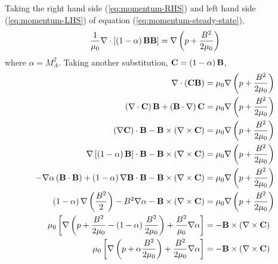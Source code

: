 Taking the right hand side (\ref{eq:momentum-RHS}) and left hand side (\ref{eq:momentum-LHS}) of equation (\ref{eq:momentum-steady-state}),
\begin{equation}
    \frac{1}{\mu_0}\nabla \cdot\left[ \left( 1-\alpha \right)\mathbf{B}\mathbf{B} \right] = \nabla\left( p + \frac{B^2}{2\mu_0} \right)
\end{equation}
where $\alpha=M_A^2$. Taking another substitution, $\mathbf{C} = \left( 1-\alpha \right)\mathbf{B}$,
\begin{equation}
    \label{eq:deldotCB}
    \begin{split}
        \nabla \cdot\left( \mathbf{C}\mathbf{B} \right) &= \mu_0\nabla\left( p + \frac{B^2}{2\mu_0} \right) \\
        \left( \nabla \cdot\mathbf{C} \right)\mathbf{B} + \left( \mathbf{B}\cdot\nabla \right)\mathbf{C} &= \mu_0\nabla\left( p + \frac{B^2}{2\mu_0} \right) \\
        \left( \nabla \mathbf{C} \right)\cdot\mathbf{B} - \mathbf{B}\times\left( \nabla \times \mathbf{C} \right) &= \mu_0\nabla\left( p + \frac{B^2}{2\mu_0} \right) \\
        \nabla\left[ \left( 1-\alpha \right)\mathbf{B} \right]\cdot\mathbf{B} - \mathbf{B}\times\left( \nabla \times \mathbf{C} \right) &= \mu_0\nabla\left( p + \frac{B^2}{2\mu_0} \right) \\
        -\nabla\alpha\left( \mathbf{B}\cdot\mathbf{B} \right) + \left( 1-\alpha \right)\nabla\mathbf{B}\cdot\mathbf{B} - \mathbf{B}\times\left( \nabla \times \mathbf{C} \right) &= \mu_0\nabla\left( p + \frac{B^2}{2\mu_0} \right) \\
        \left( 1-\alpha \right)\nabla\left( \frac{B^2}{2} \right) - B^2\nabla\alpha - \mathbf{B}\times\left( \nabla \times \mathbf{C} \right) &= \mu_0\nabla\left( p + \frac{B^2}{2\mu_0} \right) \\
        \mu_0\left[ \nabla\left( p + \frac{B^2}{2\mu_0} - \left( 1-\alpha \right)\frac{B^2}{2\mu_0} \right) + \frac{B^2}{\mu_0}\nabla\alpha \right] &= -\mathbf{B}\times\left( \nabla \times \mathbf{C} \right) \\
        \mu_0\left[ \nabla\left( p + \alpha\frac{B^2}{2\mu_0} \right) + \frac{B^2}{2\mu_0}\nabla\alpha \right] &= -\mathbf{B}\times\left( \nabla \times \mathbf{C} \right) \\
    \end{split}
\end{equation}

